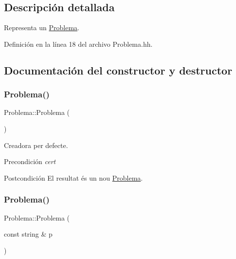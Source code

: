 \subsection{Descripción detallada}
Representa un \mbox{\hyperlink{class_problema}{Problema}}. 

Definición en la línea 18 del archivo Problema.\+hh.



\subsection{Documentación del constructor y destructor}
\mbox{\label{class_problema_a9d81af5f3f42a1b4354ad8f3c022fca3}} 
\subsubsection{\texorpdfstring{Problema()}{Problema()}\hspace{0.1cm}{\footnotesize\ttfamily [1/2]}}
{\footnotesize\ttfamily Problema\+::\+Problema (\begin{DoxyParamCaption}{ }\end{DoxyParamCaption})}



Creadora per defecte. 

\begin{DoxyPrecond}{Precondición}
{\itshape cert} 
\end{DoxyPrecond}
\begin{DoxyPostcond}{Postcondición}
El resultat és un nou \mbox{\hyperlink{class_problema}{Problema}}. 
\end{DoxyPostcond}
\mbox{\label{class_problema_a1e324e71f69700442f8740f5720c983a}} 
\subsubsection{\texorpdfstring{Problema()}{Problema()}\hspace{0.1cm}{\footnotesize\ttfamily [2/2]}}
{\footnotesize\ttfamily Problema\+::\+Problema (\begin{DoxyParamCaption}\item[{const string \&}]{p }\end{DoxyParamCaption})}



